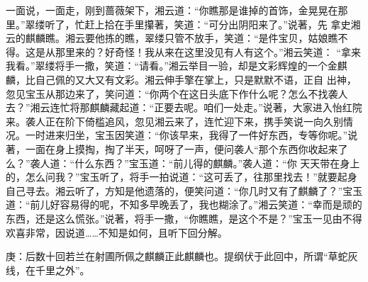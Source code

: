 \begin{parag}
    一面说，一面走，刚到蔷薇架下，湘云道：“你瞧那是谁掉的首饰，金晃晃在那里。”翠缕听了，忙赶上拾在手里攥著，笑道：“可分出阴阳来了。”说著，先 拿史湘云的麒麟瞧。湘云要他拣的瞧，翠缕只管不放手，笑道：“是件宝贝，姑娘瞧不得。这是从那里来的？好奇怪！我从来在这里没见有人有这个。”湘云笑道： “拿来我看。”翠缕将手一撒，笑道：“请看。”湘云举目一验，却是文彩辉煌的一个金麒麟，比自己佩的又大又有文彩。湘云伸手擎在掌上，只是默默不语，正自 出神，忽见宝玉从那边来了，笑问道：“你两个在这日头底下作什么呢？怎么不找袭人去？”湘云连忙将那麒麟藏起道：“正要去呢。咱们一处走。”说著，大家进入怡红院来。袭人正在阶下倚槛追风，忽见湘云来了，连忙迎下来，携手笑说一向久别情况。一时进来归坐，宝玉因笑道：“你该早来，我得了一件好东西，专等你呢。”说著，一面在身上摸掏，掏了半天，呵呀了一声，便问袭人“那个东西你收起来了么？”袭人道：“什么东西？”宝玉道：“前儿得的麒麟。”袭人道：“你 天天带在身上的，怎么问我？”宝玉听了，将手一拍说道：“这可丢了，往那里找去！”就要起身自己寻去。湘云听了，方知是他遗落的，便笑问道：“你几时又有了麒麟了？”宝玉道：“前儿好容易得的呢，不知多早晚丢了，我也糊涂了。”湘云笑道：“幸而是顽的东西，还是这么慌张。”说著，将手一撒，“你瞧瞧，是这个不是？”宝玉一见由不得欢喜非常，因说道……不知是如何，且听下回分解。
\end{parag}


\begin{parag}
    \begin{note}庚：后数十回若兰在射圃所佩之麒麟正此麒麟也。提纲伏于此回中，所谓“草蛇灰线，在千里之外”。\end{note}
\end{parag}

